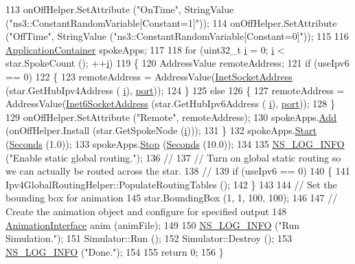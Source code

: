 \begin{DoxyCode}
113   onOffHelper.SetAttribute (\textcolor{stringliteral}{"OnTime"}, StringValue (\textcolor{stringliteral}{"ns3::ConstantRandomVariable[Constant=1]"}));
114   onOffHelper.SetAttribute (\textcolor{stringliteral}{"OffTime"}, StringValue (\textcolor{stringliteral}{"ns3::ConstantRandomVariable[Constant=0]"}));
115 
116   \hyperlink{classns3_1_1ApplicationContainer}{ApplicationContainer} spokeApps;
117 
118   \textcolor{keywordflow}{for} (uint32\_t \hyperlink{bernuolliDistribution_8m_a6f6ccfcf58b31cb6412107d9d5281426}{i} = 0; \hyperlink{bernuolliDistribution_8m_a6f6ccfcf58b31cb6412107d9d5281426}{i} < star.SpokeCount (); ++\hyperlink{bernuolliDistribution_8m_a6f6ccfcf58b31cb6412107d9d5281426}{i})
119     \{
120       AddressValue remoteAddress;
121       \textcolor{keywordflow}{if} (useIpv6 == 0)
122         \{
123           remoteAddress = AddressValue(\hyperlink{classns3_1_1InetSocketAddress}{InetSocketAddress} (star.GetHubIpv4Address (
      \hyperlink{bernuolliDistribution_8m_a6f6ccfcf58b31cb6412107d9d5281426}{i}), \hyperlink{dsdv-manet_8cc_a8e0798404bf2cf5dabb84c5ba9a4f236}{port}));
124         \}
125       \textcolor{keywordflow}{else}
126         \{
127           remoteAddress = AddressValue(\hyperlink{classns3_1_1Inet6SocketAddress}{Inet6SocketAddress} (star.GetHubIpv6Address (
      \hyperlink{bernuolliDistribution_8m_a6f6ccfcf58b31cb6412107d9d5281426}{i}), \hyperlink{dsdv-manet_8cc_a8e0798404bf2cf5dabb84c5ba9a4f236}{port}));
128         \}
129       onOffHelper.SetAttribute (\textcolor{stringliteral}{"Remote"}, remoteAddress);
130       spokeApps.\hyperlink{classns3_1_1ApplicationContainer_ad09ab1a1ad5849d518d5f4c262e38152}{Add} (onOffHelper.Install (star.GetSpokeNode (\hyperlink{bernuolliDistribution_8m_a6f6ccfcf58b31cb6412107d9d5281426}{i})));
131     \}
132   spokeApps.\hyperlink{classns3_1_1ApplicationContainer_a8eff87926507020bbe3e1390358a54a7}{Start} (\hyperlink{group__timecivil_ga33c34b816f8ff6628e33d5c8e9713b9e}{Seconds} (1.0));
133   spokeApps.\hyperlink{classns3_1_1ApplicationContainer_adfc52f9aa4020c8714679b00bbb9ddb3}{Stop} (\hyperlink{group__timecivil_ga33c34b816f8ff6628e33d5c8e9713b9e}{Seconds} (10.0));
134 
135   \hyperlink{group__logging_gafbd73ee2cf9f26b319f49086d8e860fb}{NS\_LOG\_INFO} (\textcolor{stringliteral}{"Enable static global routing."});
136   \textcolor{comment}{//}
137   \textcolor{comment}{// Turn on global static routing so we can actually be routed across the star.}
138   \textcolor{comment}{//}
139   \textcolor{keywordflow}{if} (useIpv6 == 0)
140     \{
141       Ipv4GlobalRoutingHelper::PopulateRoutingTables ();
142     \}
143 
144   \textcolor{comment}{// Set the bounding box for animation}
145   star.BoundingBox (1, 1, 100, 100);
146 
147   \textcolor{comment}{// Create the animation object and configure for specified output}
148   \hyperlink{classns3_1_1AnimationInterface}{AnimationInterface} anim (animFile);
149 
150   \hyperlink{group__logging_gafbd73ee2cf9f26b319f49086d8e860fb}{NS\_LOG\_INFO} (\textcolor{stringliteral}{"Run Simulation."});
151   Simulator::Run ();
152   Simulator::Destroy ();
153   \hyperlink{group__logging_gafbd73ee2cf9f26b319f49086d8e860fb}{NS\_LOG\_INFO} (\textcolor{stringliteral}{"Done."});
154 
155   \textcolor{keywordflow}{return} 0;
156 \}
\end{DoxyCode}


